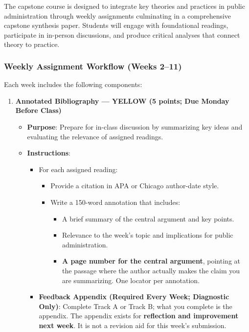 \documentclass[11pt]{article}     %
\begin{document}
The capstone course is designed to integrate key theories and practices in public administration through weekly assignments culminating in a comprehensive capstone synthesis paper. Students will engage with foundational readings, participate in in-person discussions, and produce critical analyses that connect theory to practice.

\subsubsection*{Weekly Assignment Workflow (Weeks 2--11)}

Each week includes the following components:

\begin{enumerate}
    \item \textbf{Annotated Bibliography --- YELLOW (5 points; Due Monday Before Class)}
    \begin{itemize}
        \item \textbf{Purpose}: Prepare for in-class discussion by summarizing key ideas and evaluating the relevance of assigned readings.
        \item \textbf{Instructions}:
        \begin{itemize}
            \item For each assigned reading:
            \begin{itemize}
                \item Provide a citation in APA or Chicago author-date style.
                \item Write a 150-word annotation that includes:
                \begin{itemize}
                    \item A brief summary of the central argument and key points.
                    \item Relevance to the week's topic and implications for public administration.
                    \item \textbf{A page number for the central argument}, pointing at the passage where the author actually makes the claim you are summarizing. One locator per annotation.
                \end{itemize}
            \end{itemize}

            \item \textbf{Feedback Appendix (Required Every Week; Diagnostic Only)}: Complete Track A or Track B; what you complete is the appendix. The appendix exists for \textbf{reflection and improvement next week}. It is not a revision aid for this week's submission.


\end{itemize}
\end{itemize}
\end{enumerate}
\end{document}
